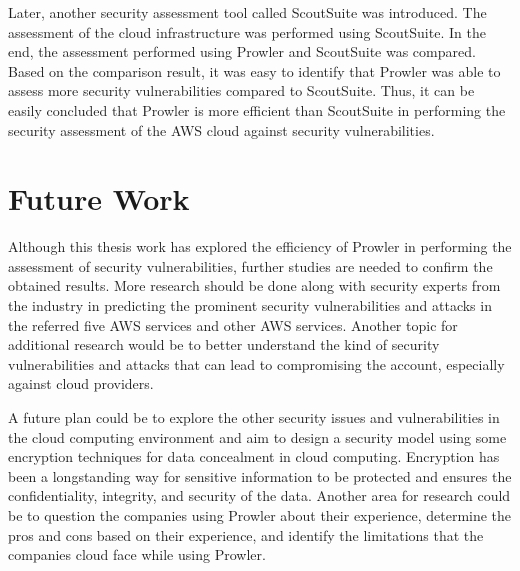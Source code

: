 \par Later, another security assessment tool called ScoutSuite was introduced.
The assessment of the cloud infrastructure was performed using ScoutSuite.
In the end, the assessment performed using Prowler and ScoutSuite was compared.
Based on the comparison result, it was easy to identify that Prowler was able to assess more security vulnerabilities compared to ScoutSuite.
Thus, it can be easily concluded that Prowler is more
efficient than ScoutSuite in performing the security assessment of the AWS cloud against security vulnerabilities.




\section{Future Work}

\par Although this thesis work has explored the efficiency of Prowler in performing the assessment of security vulnerabilities, further studies are needed to confirm the obtained results.
More research should be done along with security experts from the industry in predicting the prominent security vulnerabilities and attacks in the referred five AWS services and other AWS services.
Another topic for additional research would be to better understand the kind of security vulnerabilities and attacks that can lead to compromising the account, especially against cloud providers.

\par A future plan could be to explore the other security issues and vulnerabilities in the cloud computing environment and aim to design a security model using some encryption techniques for data concealment in cloud computing.
Encryption has been a longstanding way for sensitive information to be protected and ensures the confidentiality, integrity, and security of the data.
Another area for research could be to question the companies using Prowler about their experience, determine the pros and cons based on their experience, and identify the limitations that the companies cloud face while using Prowler.